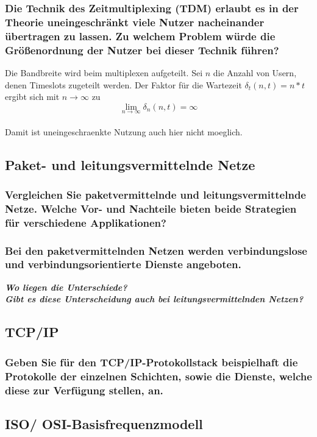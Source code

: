 \documentclass{article}
\newcommand{\headline}[1]{\textbf{\textit{#1}}\\}
\begin{document}
\subsubsection{
    Die Technik des Zeitmultiplexing (TDM) erlaubt es in der Theorie
    uneingeschränkt viele Nutzer nacheinander übertragen zu lassen. 
    Zu welchem Problem würde die Größenordnung der Nutzer bei 
    dieser Technik führen?
}
Die Bandbreite wird beim multiplexen aufgeteilt. 
Sei $n$ die Anzahl von Usern, denen Timeslots zugeteilt werden. 
Der Faktor für die Wartezeit $\delta_t(n, t) = n * t$
ergibt sich mit $n \to \infty$ zu
$$
\lim_{n \to \infty} \delta_n(n, t) = \infty
$$\\
Damit ist uneingeschraenkte Nutzung auch hier nicht moeglich.\\

\subsection{Paket- und leitungsvermittelnde Netze}

\subsubsection{
    Vergleichen Sie paketvermittelnde und leitungsvermittelnde Netze.
    Welche Vor- und Nachteile bieten beide Strategien für 
    verschiedene Applikationen?
}

\subsubsection{
    Bei den paketvermittelnden Netzen werden verbindungslose und 
    verbindungsorientierte Dienste angeboten.
}
\headline{Wo liegen die Unterschiede?}
\headline{
    Gibt es diese Unterscheidung auch bei leitungsvermittelnden 
    Netzen?
} 

\subsection{TCP/IP}
\subsubsection{
    Geben Sie für den TCP/IP-Protokollstack beispielhaft die 
    Protokolle der einzelnen Schichten, sowie die Dienste,
    welche diese zur Verfügung stellen, an.
}

\subsection{ISO/ OSI-Basisfrequenzmodell}
\end{document}
